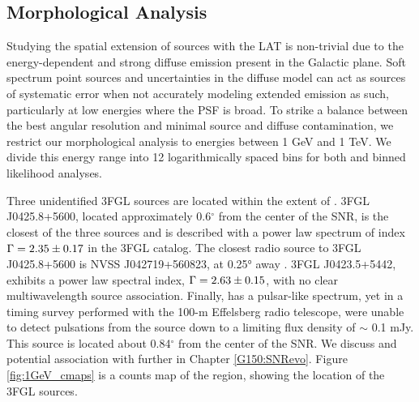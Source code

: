 \subsection{Morphological Analysis}\label{G150:LATmorph}
Studying the spatial extension of sources with the LAT is non-trivial due to the energy-dependent \psf{} and strong diffuse emission present in the Galactic plane. Soft spectrum point sources and uncertainties in the diffuse model can act as sources of systematic error when not accurately modeling extended emission as such, particularly at low energies where the PSF is broad. To strike a balance between the best angular resolution and minimal source and diffuse contamination, we restrict our morphological analysis to energies between 1 GeV and 1 TeV. We divide this energy range into 12 logarithmically spaced bins for both \ptlike{} and \gtlike{} binned likelihood analyses. 

Three  unidentified 3FGL sources are located within the extent of \Gone{}. 3FGL J0425.8+5600, located approximately 0.6$^\circ$ from the center of the SNR, is the closest of the three sources and is described with a power law spectrum of index ${\rm \Gamma = 2.35\pm 0.17}$  in the 3FGL catalog. The closest radio source to 3FGL J0425.8+5600 is NVSS J042719+560823, at 0.25° away \citep{Condon98}. 3FGL J0423.5+5442, exhibits a power law spectral index, ${\rm \Gamma = 2.63\pm 0.15}$, with no clear multiwavelength source association. Finally, \psrLike{} has a pulsar-like spectrum, yet in a timing survey performed with the 100-m  Effelsberg radio telescope, \cite{Barr13} were unable to detect pulsations from the source down to a limiting flux density of $\sim$ 0.1 mJy. This source is located about 0.84$^{\circ}$ from the center of the SNR. We discuss \psrLike{} and potential association with \Gone{} further in Chapter \ref{G150:SNRevo}. Figure \ref{fig:1GeV_cmaps} is a counts map of the region, showing the location of the 3FGL sources.

